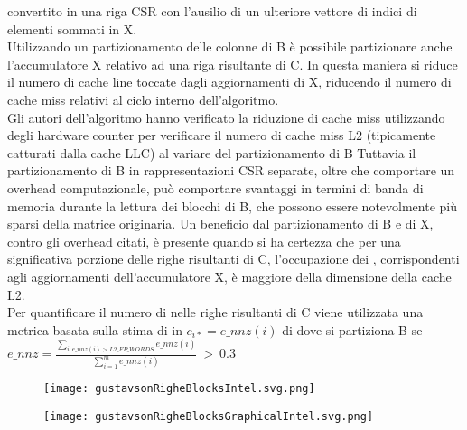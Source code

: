 convertito in una riga CSR con l'ausilio di un ulteriore vettore di indici di
elementi \nnz sommati in X.\\
Utilizzando un partizionamento delle colonne di B è possibile partizionare anche
l'accumulatore X relativo ad una riga risultante di C. In questa maniera si
riduce il numero di cache line toccate dagli aggiornamenti di X, riducendo il
numero di cache miss relativi al ciclo interno dell'algoritmo.\\
Gli autori dell'algoritmo hanno verificato la riduzione di cache miss
utilizzando degli hardware counter per verificare il numero di cache miss L2
(tipicamente catturati dalla cache LLC) al variare del partizionamento di B %
Tuttavia il partizionamento di B in rappresentazioni CSR separate, 
oltre che comportare un overhead computazionale, può comportare svantaggi in
termini di banda di memoria durante la lettura dei blocchi di B, che possono
essere notevolmente più sparsi della matrice originaria. %
Un beneficio dal partizionamento di B e di X, contro gli overhead citati, è
presente quando si ha certezza che per una significativa porzione delle righe
risultanti di C, l'occupazione dei \nnz, corrispondenti agli aggiornamenti
dell'accumulatore X, è maggiore della dimensione della cache L2.\\
Per quantificare il numero di \nnz nelle righe risultanti di C viene utilizzata
una metrica basata sulla stima di \nnz in $c_{i*}=e\_nnz(i)$ di
\parencite{intelSpGEMMDenseAccumulator} %
dove si partiziona B se
$e\_nnz = \frac{\sum\limits_{i:e\_nnz(i) > L2\_FP\_WORDS} e\_nnz(i)}
{\sum\limits_{i=1}^m e\_nnz(i)} ~>~0.3$\\
\begin{figure}[h]
  \centering \texttt{[image: gustavsonRigheBlocksIntel.svg.png]}
  \caption[adattamento parallelo dell'algoritmo di Gustavson] \decoRule \label{figCode:gustavsonRigheBlocksIntel}
\end{figure}
\begin{figure}[h]
  \caption[rappresentazione grafica dell'adattamento parallelo dell'algoritmo di Gustavson] 
  \centering \texttt{[image: gustavsonRigheBlocksGraphicalIntel.svg.png]} \label{fig:gustavsonRigheBlocksGraphicalIntel}
\end{figure}

